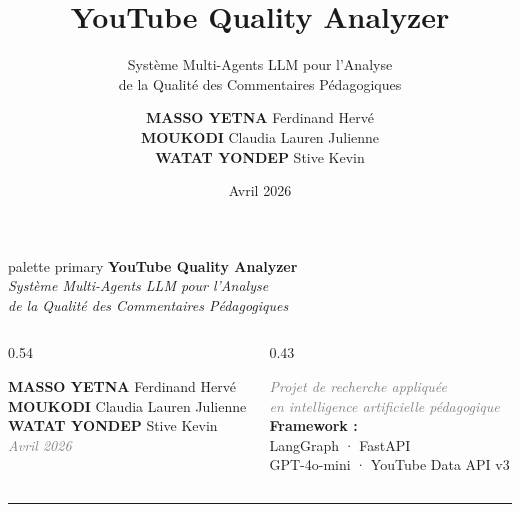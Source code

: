 \documentclass[aspectratio=169, 12pt]{beamer}
\title[YouTube Quality Analyzer]{YouTube Quality Analyzer}
\subtitle{Système Multi-Agents LLM pour l'Analyse\\
          de la Qualité des Commentaires Pédagogiques}
\author[MASSO YETNA · MOUKODI · WATAT]{
  \textbf{MASSO YETNA} Ferdinand Hervé \\[0.2em]
  \textbf{MOUKODI} Claudia Lauren Julienne \\[0.2em]
  \textbf{WATAT YONDEP} Stive Kevin
}
\institute{}
\date{Avril 2026}
\begin{document}

\begin{frame}[plain]

  \begin{beamercolorbox}[wd=\paperwidth, ht=3.0cm, dp=0.4cm, center]{palette primary}
    \vspace{0.45cm}
    {\LARGE\textbf{YouTube Quality Analyzer}}\\[0.3em]
    {\small\itshape Système Multi-Agents LLM pour l'Analyse\\
    de la Qualité des Commentaires Pédagogiques}
  \end{beamercolorbox}

  \vspace{0.35cm}

  \begin{columns}[T]
    \begin{column}{0.54\textwidth}
      \begin{center}
        \small
        \textbf{MASSO YETNA} Ferdinand Hervé\\[0.18em]
        \textbf{MOUKODI} Claudia Lauren Julienne\\[0.18em]
        \textbf{WATAT YONDEP} Stive Kevin\\[0.35em]
        \textcolor{gray}{\textit{Avril 2026}}
      \end{center}
    \end{column}
    \begin{column}{0.43\textwidth}
      \begin{center}
        \scriptsize\textcolor{gray}{\textit{Projet de recherche appliquée\\
        en intelligence artificielle pédagogique}}\\[0.35em]
        \scriptsize\textbf{Framework :}\\[0.1em]
        \scriptsize LangGraph · FastAPI\\
        GPT-4o-mini · YouTube Data API v3
      \end{center}
    \end{column}
  \end{columns}

  \vspace{0.25cm}
  {\color{mainblue!30}\rule{\linewidth}{0.4pt}}
  \vspace{0.15cm}


\end{frame}
\end{document}
